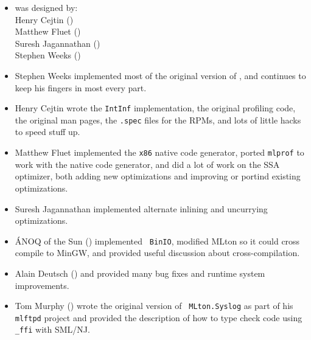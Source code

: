 
\begin{itemize}

\item
{\mlton} was designed by:\\
\hspace*{2em}Henry Cejtin ()\\
\hspace*{2em}Matthew Fluet ()\\
\hspace*{2em}Suresh Jagannathan ()\\
\hspace*{2em}Stephen Weeks ()

\item
Stephen Weeks implemented most of the original version of {\mlton}, and
continues to keep his fingers in most every part.

\item
Henry Cejtin wrote the {\tt IntInf} implementation,
the original profiling code,
the original man pages,
the {\tt .spec} files for the RPMs,
and lots of little hacks to speed stuff up.

\item
Matthew Fluet implemented the {\tt x86} native code generator,
ported {\tt mlprof} to work with the native code generator,
and did a lot of work on the SSA optimizer, both adding new optimizations
and improving or portind existing optimizations.

\item
Suresh Jagannathan implemented alternate inlining and uncurrying optimizations.

\item
\'{A}NOQ of the Sun () implemented {\tt
BinIO}, modified MLton so it could cross compile to MinGW, and provided useful
discussion about cross-compilation.

\item
Alain Deutsch () and  provided many bug fixes and
runtime system improvements.

\item
Tom Murphy () wrote the original version of {\tt
MLton.Syslog} as part of his {\tt mlftpd} project and provided the description
of how to type check code using {\tt \_ffi} with SML/NJ.


\end{itemize}
